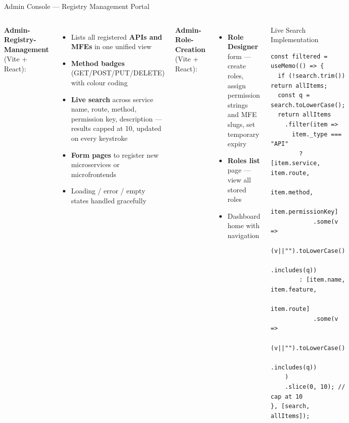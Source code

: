 \documentclass[aspectratio=169]{beamer}
\begin{document}
\begin{frame}{Admin Console --- Registry Management Portal}
  \begin{columns}[t]
    \textbf{Admin-Registry-Management} (Vite + React):
    \begin{itemize}
      \item Lists all registered \textbf{APIs and MFEs} in one unified view
      \item \textbf{Method badges} (GET/POST/PUT/DELETE) with colour coding
      \item \textbf{Live search} across service name, route, method, permission key,
            description --- results capped at 10, updated on every keystroke
      \item \textbf{Form pages} to register new microservices or microfrontends
      \item Loading / error / empty states handled gracefully
    \end{itemize}
    \vspace{0.3cm}
    \textbf{Admin-Role-Creation} (Vite + React):
    \begin{itemize}
      \item \textbf{Role Designer} form --- create roles, assign permission strings
            and MFE slugs, set temporary expiry
      \item \textbf{Roles list} page --- view all stored roles
      \item Dashboard home with navigation
    \end{itemize}

    \begin{exampleblock}{Live Search Implementation}
      \lstset{style=jsStyle, language=JavaScript}
      \begin{lstlisting}
const filtered = useMemo(() => {
  if (!search.trim()) return allItems;
  const q = search.toLowerCase();
  return allItems
    .filter(item =>
      item._type === "API"
        ? [item.service, item.route,
           item.method,
           item.permissionKey]
            .some(v =>
              (v||"").toLowerCase()
              .includes(q))
        : [item.name, item.feature,
           item.route]
            .some(v =>
              (v||"").toLowerCase()
              .includes(q))
    )
    .slice(0, 10); // cap at 10
}, [search, allItems]);
      \end{lstlisting}
    \end{exampleblock}
  \end{columns}
\end{frame}
\end{document}
